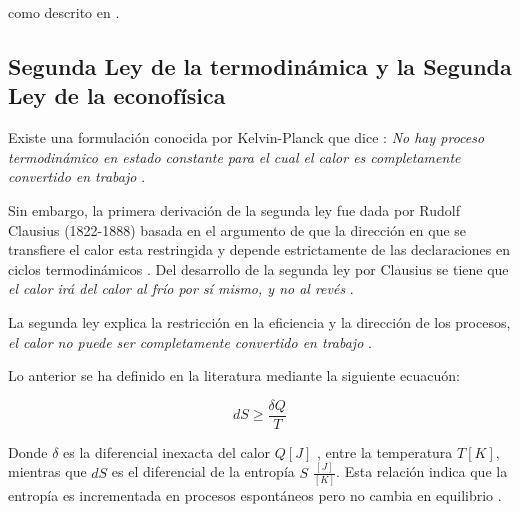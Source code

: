 
como descrito en \citep{Huang2021}.



\subsection{Segunda Ley de la termodinámica y la Segunda Ley de la econofísica} 


%



Existe una formulación conocida por Kelvin-Planck que dice : \textit{No hay proceso termodinámico en estado constante para el cual el calor es completamente convertido en trabajo} \citep[][pagina 86]{struchtrup}.

Sin embargo, la primera derivación de la segunda ley fue dada por Rudolf Clausius (1822-1888) basada en el argumento de que la dirección en que se transfiere el calor esta restringida y depende estrictamente de las declaraciones en ciclos termodinámicos \citep[][pagina 55]{struchtrup}.  Del desarrollo de la segunda ley por Clausius se tiene que \textit{el calor irá del calor al frío por sí mismo, y no al revés} \citep[][pagina 64]{struchtrup}.

La segunda ley explica la restricción en la eficiencia y la dirección de los procesos, \textit{el calor no puede ser completamente convertido en trabajo} \citep[][pagina 5]{struchtrup}. 

Lo anterior se ha definido en la literatura mediante la siguiente ecuacuón:

\begin{equation}
dS \geqslant \frac{\delta Q}{T}
\end{equation}

Donde $\delta$ es la diferencial inexacta del calor $Q [J]$ , entre la temperatura $T [K]$, mientras que $dS$ es el diferencial de la entropía $S$ $\frac{[J]}{[K]}$. Esta relación indica que la entropía es incrementada en procesos espontáneos pero no cambia en equilibrio \citep[][pagina 340]{keszei2011chemical}. 

